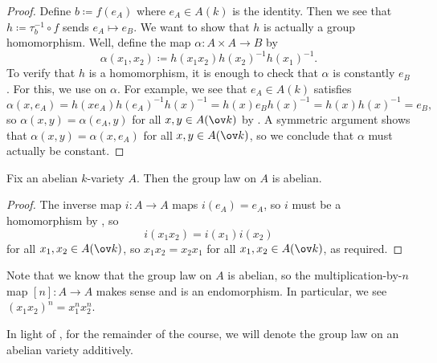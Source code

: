 \documentclass[../notes.tex]{subfiles}
\begin{document}
\begin{proof}
	Define $b\coloneqq f(e_A)$ where $e_A\in A(k)$ is the identity. Then we see that $h\coloneqq\tau_b^{-1}\circ f$ sends $e_A\mapsto e_B$. We want to show that $h$ is actually a group homomorphism. Well, define the map $\alpha\colon A\times A\to B$ by
	\[\alpha(x_1,x_2)\coloneqq h(x_1x_2)h(x_2)^{-1}h(x_1)^{-1}.\]
	To verify that $h$ is a homomorphism, it is enough to check that $\alpha$ is constantly $e_B$. For this, we use  on $\alpha$. For example, we see that $e_A\in A(k)$ satisfies
	\[\alpha(x,e_A)=h(xe_A)h(e_A)^{-1}h(x)^{-1}=h(x)e_Bh(x)^{-1}=h(x)h(x)^{-1}=e_B,\]
	so $\alpha(x,y)=\alpha(e_A,y)$ for all $x,y\in A(\ov k)$ by . A symmetric argument shows that $\alpha(x,y)=\alpha(x,e_A)$ for all $x,y\in A(\ov k)$, so we conclude that $\alpha$ must actually be constant.
\end{proof}
\begin{corollary} \label{cor:ab-var-comm}
	Fix an abelian $k$-variety $A$. Then the group law on $A$ is abelian.
\end{corollary}
\begin{proof}
	The inverse map $i\colon A\to A$ maps $i(e_A)=e_A$, so $i$ must be a homomorphism by , so
	\[i(x_1x_2)=i(x_1)i(x_2)\]
	for all $x_1,x_2\in A(\ov k)$, so $x_1x_2=x_2x_1$ for all $x_1,x_2\in A(\ov k)$, as required.
\end{proof}
\begin{remark}
	Note that we know that the group law on $A$ is abelian, so the multiplication-by-$n$ map $[n]\colon A\to A$ makes sense and is an endomorphism. In particular, we see $(x_1x_2)^n=x_1^nx_2^n$.
\end{remark}
\begin{notation}
	In light of , for the remainder of the course, we will denote the group law on an abelian variety additively.
\end{notation}
\end{document}
